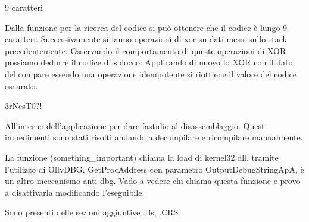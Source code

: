 \documentclass[a4paper,10pt]{article}
\begin{document}
9 caratteri

Dalla funzione per la ricerca del codice si può ottenere che il codice è lungo 9 caratteri. Successivamente si fanno operazioni di xor su dati messi sullo stack precedentemente. Osservando il comportamento di queste operazioni di XOR possiamo dedurre il codice di sblocco. Applicando di nuovo lo XOR con il dato del compare essendo una operazione idempotente si riottiene il valore del codice oscurato.

3rNesT0?!

All'interno dell'applicazione per dare fastidio al disassemblaggio. Questi impedimenti sono stati risolti andando a decompilare e ricompilare manualmente.



La funzione (something\_important) chiama la load di kernel32.dll, tramite l'utilizzo di OllyDBG. GetProcAddress con parametro OutputDebugStringApA, è un altro meccanismo anti dbg. Vado a vedere chi chiama questa funzione e provo a disattivarla modificando l'eseguibile.

Sono presenti delle sezioni aggiuntive .tls, .CRS
\end{document}
